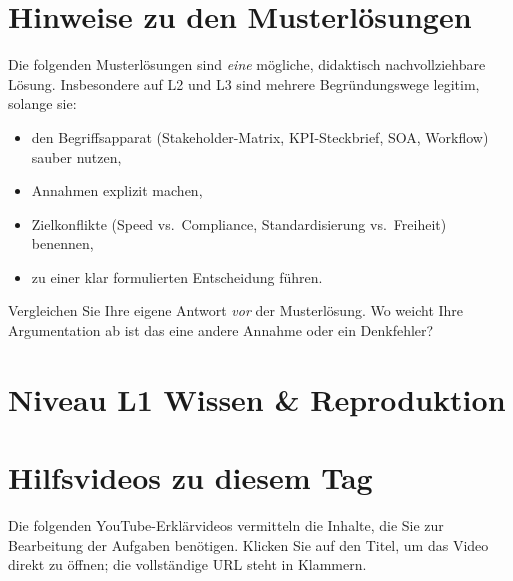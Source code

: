 \documentclass[11pt,a4paper,oneside]{article}
\begin{document}
\section*{Hinweise zu den Musterl\"osungen}
\thispagestyle{plain}

\noindent Die folgenden Musterl\"osungen sind \emph{eine} m\"ogliche, didaktisch nachvollziehbare L\"osung. Insbesondere auf L2 und L3 sind mehrere Begr\"undungswege legitim, solange sie:

\begin{itemize}
  \item den Begriffsapparat (Stakeholder-Matrix, KPI-Steckbrief, SOA, Workflow) sauber nutzen,
  \item Annahmen explizit machen,
  \item Zielkonflikte (Speed vs.\ Compliance, Standardisierung vs.\ Freiheit) benennen,
  \item zu einer klar formulierten Entscheidung f\"uhren.
\end{itemize}

\begin{infobox}
Vergleichen Sie Ihre eigene Antwort \emph{vor} der Musterl\"osung. Wo weicht Ihre Argumentation ab \textendash{} ist das eine andere Annahme oder ein Denkfehler?
\end{infobox}

\clearpage

\section*{Niveau L1 \textendash{} Wissen \& Reproduktion}

\section*{Hilfsvideos zu diesem Tag}
\thispagestyle{plain}

\noindent Die folgenden YouTube-Erkl\"arvideos vermitteln die Inhalte, die Sie zur Bearbeitung der Aufgaben ben\"otigen. Klicken Sie auf den Titel, um das Video direkt zu \"offnen; die vollst\"andige URL steht in Klammern.
\end{document}
